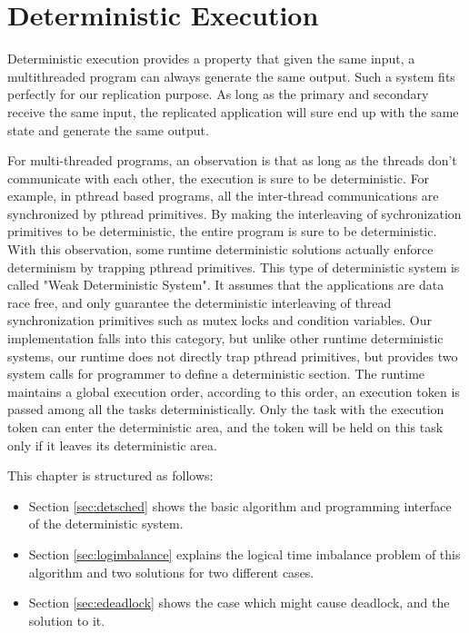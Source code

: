 \chapter{Deterministic Execution}
Deterministic execution provides a property that given the same input, a multithreaded program can always generate the same output. Such a system fits perfectly for our replication purpose. As long as the primary and secondary receive the same input, the replicated application will sure end up with the same state and generate the same output.

For multi-threaded programs, an observation is that as long as the threads don't communicate with each other, the execution is sure to be deterministic\cite{devietti2009dmp}. For example, in pthread based programs, all the inter-thread communications are synchronized by pthread primitives. By making the interleaving of sychronization primitives to be deterministic, the entire program is sure to be deterministic. With this observation, some runtime deterministic solutions actually enforce determinism by trapping pthread primitives\cite{cui2013parrot}\cite{liu2011dthreads}\cite{olszewski2009kendo}. This type of deterministic system is called "Weak Deterministic System". It assumes that the applications are data race free, and only guarantee the deterministic interleaving of thread synchronization primitives such as mutex locks and condition variables. Our implementation falls into this category, but unlike other runtime deterministic systems, our runtime does not directly trap pthread primitives, but provides two system calls for programmer to define a deterministic section. The runtime maintains a global execution order, according to this order, an execution token is passed among all the tasks deterministically. Only the task with the execution token can enter the deterministic area, and the token will be held on this task only if it leaves its deterministic area.

This chapter is structured as follows:
\begin{itemize}
\item Section \ref{sec:detsched} shows the basic algorithm and programming interface of the deterministic system.
\item Section \ref{sec:logimbalance} explains the logical time imbalance problem of this algorithm and two solutions for two different cases.
\item Section \ref{sec:edeadlock} shows the case which might cause deadlock, and the solution to it.
\end{itemize}


